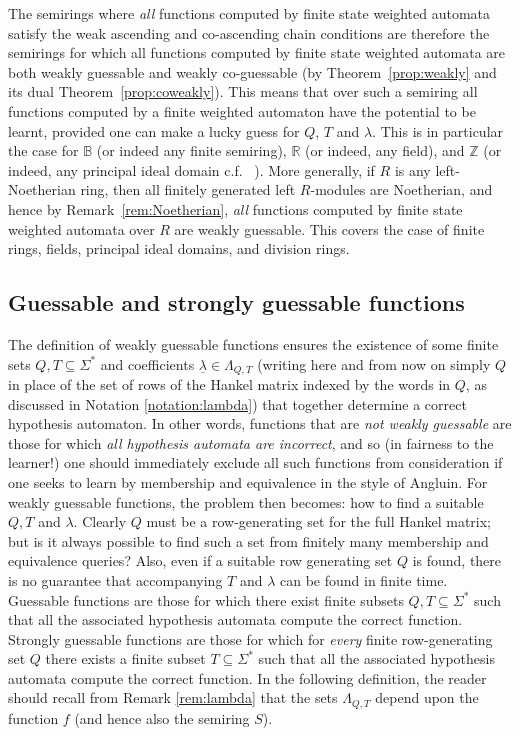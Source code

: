 \documentclass{lmcs}
\numberwithin{theorem}{section}
\begin{document}
\begin{rem}
\label{rem:fields2}
The semirings where \emph{all} functions computed by finite state weighted automata satisfy the weak ascending and co-ascending chain conditions are therefore the semirings for which all functions computed by finite state weighted automata are both weakly guessable and weakly co-guessable (by Theorem~\ref{prop:weakly} and its dual Theorem~\ref{prop:coweakly}). This means that over such a semiring all functions computed by a finite weighted automaton  have the potential to be learnt, provided one can make a lucky guess for $Q$, $T$ and $\lambda$. This is in particular the case for $\mathbb{B}$ (or indeed any finite semiring), $\mathbb{R}$ (or indeed, any field), and $\mathbb{Z}$  (or indeed, any principal ideal domain c.f. ~\cite{HKRS20}). More generally, if $R$ is any left-Noetherian ring, then all finitely generated left $R$-modules are Noetherian, and hence by Remark~\ref{rem:Noetherian}, \emph{all} functions computed by finite state weighted automata over $R$ are weakly guessable. This covers the case of finite rings, fields, principal ideal domains, and division rings.
\end{rem}

\subsection{Guessable and strongly guessable functions}

The definition of weakly guessable functions ensures the existence of some finite sets $Q,T \subseteq \Sigma^*$ and coefficients $\underline{\lambda} \in \Lambda_{Q,T}$ (writing here and from now on simply $Q$ in place of the set of rows of the Hankel matrix indexed by the words in $Q$, as discussed in Notation \ref{notation:lambda}) that together determine a correct hypothesis automaton. In other words, functions that are \emph{not weakly guessable} are those for which \emph{all hypothesis automata are incorrect}, and so (in fairness to the learner!) one should immediately exclude all such functions from consideration if one seeks to learn by membership and equivalence in the style of Angluin. For weakly guessable functions, the problem then becomes: how to find a suitable $Q, T$ and $\lambda$. Clearly $Q$ must be a row-generating set for the full Hankel matrix; but is it always possible to find such a set from finitely many membership and equivalence queries? Also, even if a suitable row generating set $Q$ is found, there is no guarantee that accompanying $T$ and $\lambda$ can be found in finite time. Guessable functions are those for which there exist finite subsets $Q, T \subseteq \Sigma^*$ such that all the associated hypothesis automata compute the correct function. Strongly guessable functions are those for which for \emph{every} finite row-generating set $Q$ there exists a finite subset $T \subseteq \Sigma^*$ such that all the associated hypothesis automata compute the correct function. In the following definition, the reader should recall from Remark \ref{rem:lambda} that the sets $\Lambda_{Q, T}$ depend upon the function $f$ (and hence also the semiring $S$).
\end{document}
